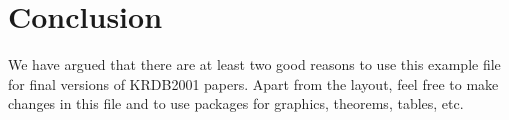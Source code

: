 \documentclass[11pt,twoside]{article}
\begin{document}
\section{Conclusion}
We have argued that there are at least two good reasons to use this
example file for final versions of KRDB2001 papers. Apart from the layout, feel
free to make changes in this file and to use packages for graphics,
theorems, tables, etc.


%
%
\end{document}
